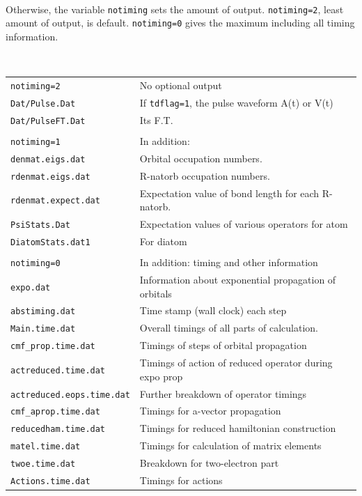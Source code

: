 \documentclass[10pt,leqno, oneside]{book}
\begin{document}
\

Otherwise, the variable \verb#notiming# sets the amount of output.  \verb#notiming=2#, least amount of output, is default.  \verb#notiming=0# gives the maximum including all timing information.

\

\begin{tabular}{ll}
\verb#notiming=2# & No optional output  \\
\quad  \verb#Dat/Pulse.Dat# & \quad If \verb#tdflag=1#, the pulse waveform A(t) or V(t)   \\
\quad  \verb#Dat/PulseFT.Dat# & \quad Its F.T.   \\

\\

\verb#notiming=1# & In addition:  \\
\quad  \verb#denmat.eigs.dat#  & \quad Orbital occupation numbers.   \\
\quad  \verb#rdenmat.eigs.dat# & \quad  R-natorb occupation numbers. \\
 \quad  \verb#rdenmat.expect.dat# & \quad Expectation value of bond length for each R-natorb. \\
 \quad \verb#PsiStats.Dat# & \quad Expectation values of various operators for atom\\
\quad \verb#DiatomStats.dat1# & \quad For diatom \\

\\

\verb#notiming=0# & In addition:  timing and other information \\
\hline
\verb#expo.dat# & \quad Information about exponential propagation of orbitals \\
\verb#abstiming.dat# & \quad Time stamp (wall clock) each step \\
\verb#Main.time.dat# & \quad Overall timings of all parts of calculation. \\
\quad \verb#cmf_prop.time.dat# & \quad Timings of steps of orbital propagation \\
\quad \quad \verb#actreduced.time.dat# & \quad Timings of action of reduced operator during expo prop \\
\quad \quad \verb#actreduced.eops.time.dat# & \quad Further breakdown of operator timings \\
\quad \verb#cmf_aprop.time.dat# & \quad Timings for a-vector propagation \\
\quad \verb#reducedham.time.dat# & \quad Timings for reduced hamiltonian construction \\
\quad \verb#matel.time.dat# & \quad Timings for calculation of matrix elements \\
\quad \quad \verb#twoe.time.dat# & \quad Breakdown for two-electron part \\
\quad \verb#Actions.time.dat# & \quad Timings for actions \\
\end{tabular}
\end{document}
